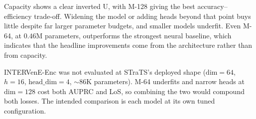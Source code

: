 Capacity shows a clear inverted U, with M-128 giving the best accuracy--efficiency trade-off. Widening the model or adding heads beyond that point buys little despite far larger parameter budgets, and smaller models underfit. Even M-64, at $0.46$M parameters, outperforms the strongest neural baseline, which indicates that the headline improvements come from the architecture rather than from capacity.

INTERVenE-Enc was not evaluated at STraTS's deployed shape ($\text{dim}{=}64$, $h{=}16$, $\text{head\_dim}{=}4$, ${\sim}86$K parameters). M-64 underfits and narrow heads at $\text{dim}{=}128$ cost both AUPRC and LoS, so combining the two would compound both losses. The intended comparison is each model at its own tuned configuration.
